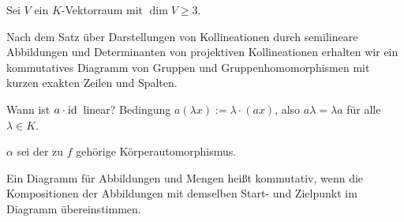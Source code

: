 Sei $V$ ein $K$-Vektorraum mit $\dim V \ge 3$.

Nach dem Satz über Darstellungen von Kollineationen durch semilineare Abbildungen und Determinanten von projektiven Kollineationen erhalten wir ein kommutatives Diagramm von Gruppen und Gruppenhomomorphismen mit kurzen exakten Zeilen und Spalten.

Wann ist $a \cdot \mathrm{id}\,$ linear? Bedingung $a(\lambda x) := \lambda \cdot (a x)$, also $a \lambda = \lambda a$ für alle $\lambda \in K$.

$\alpha$ sei der zu $f$ gehörige Körperautomorphismus.

Ein Diagramm für Abbildungen und Mengen heißt kommutativ, wenn die Kompositionen der Abbildungen mit demselben Start- und Zielpunkt im Diagramm übereinstimmen.

